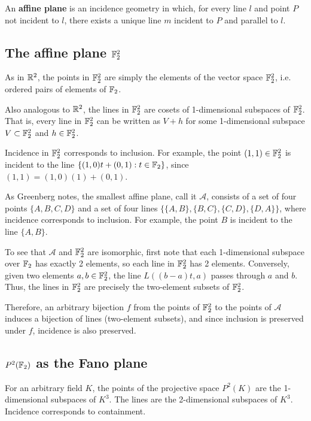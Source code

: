 \documentclass{article}
\begin{document}
\begin{definition} 
An \textbf{affine plane} is an incidence geometry in which, for every line $l$ and point $P$ not incident to $l$, there exists a unique line $m$ incident to $P$ and parallel to $l$.
\end{definition}


\subsection{The affine plane $\mathbb{F}_2^2$}
As in $\mathbb{R}^2$, the points in $\mathbb{F}_2^2$ are simply the elements of the vector space $\mathbb{F}_2^2$, i.e. ordered pairs of elements of $\mathbb{F}_2$.  

Also analogous to $\mathbb{R}^2$, the lines in $\mathbb{F}_2^2$ are cosets of 1-dimensional subspaces of $\mathbb{F}_2^2$.  That is, every line in $\mathbb{F}_2^2$ can be written as $V + h$ for some 1-dimensional subspace $V\subset \mathbb{F}_2^2$ and $h \in \mathbb{F}_2^2$.  

Incidence in $\mathbb{F}_2^2$ corresponds to inclusion.  For example, the point $(1,1) \in \mathbb{F}_2^2$ is incident to the line $\{(1,0)t + (0,1): t \in \mathbb{F}_2\}$, since $(1,1) = (1,0) (1) + (0,1)$.

As Greenberg notes, the smallest affine plane, call it $\mathcal{A}$, consists of a set of four points $\{A,B,C,D\}$ and a set of four lines $\{\{A,B\}, \{B,C\}, \{C,D\}, \{D,A\}\}$, where incidence corresponds to inclusion. For example, the point $B$ is incident to the line $\{A,B\}$.

To see that $\mathcal{A}$ and $\mathbb{F}_2^2$ are isomorphic, first note that each 1-dimensional subspace over $\mathbb{F}_2$ has exactly 2 elements, so each line in $\mathbb{F}_2^2$ has 2 elements.  Conversely, given two elements $a,b \in \mathbb{F}_2^2$, the line $L((b-a)t, a)$ passes through $a$ and $b$.  Thus, the lines in $\mathbb{F}_2^2$ are precisely the two-element subsets of $\mathbb{F}_2^2$. 

Therefore, an arbitrary bijection $f$ from the points of $\mathbb{F}_2^2$ to the points of $\mathcal A$ induces a bijection of lines (two-element subsets), and since inclusion is preserved under $f$, incidence is also preserved. 

\subsection{$P^2(\mathbb{F}_2)$ as the Fano plane}
For an arbitrary field $K$, the points of the projective space $P^2(K)$ are the 1-dimensional subspaces of $K^3$.  The lines are the 2-dimensional subspaces of $K^3$.  Incidence corresponds to containment. 
\end{document}

